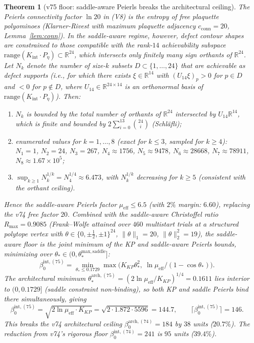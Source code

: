 \documentclass[11pt]{article}
\newtheorem{theorem}{Theorem}[section]
\theoremstyle{definition}
\begin{document}
\begin{theorem}[v75 floor: saddle-aware Peierls breaks the architectural ceiling]
\label{thm:floor-v75}
The Peierls connectivity factor $\ln 20$ in (V8) is the entropy of
\emph{free} plaquette polyominoes \textup{(}Klarner-Rivest with
maximum plaquette adjacency $c_{\mathrm{conn}}=20$,
Lemma~\ref{lem:conn}\textup{)}.  In the saddle-aware regime, however,
defect contour shapes are constrained to those compatible with the
rank-$14$ achievability subspace
$\mathrm{range}(K_{\mathrm{int}}\cdot P_\eta)\subset\mathbb{R}^{24}$,
which intersects only finitely many sign orthants of $\mathbb{R}^{24}$.
Let $N_k$ denote the number of size-$k$ subsets
$D\subset\{1,\dots,24\}$ that are achievable as defect supports
\textup{(}i.e., for which there exists $\xi\in\mathbb{R}^{14}$ with
$(U_{14}\xi)_p>0$ for $p\in D$ and $<0$ for $p\notin D$,
where $U_{14}\in\mathbb{R}^{24\times 14}$ is an orthonormal basis of
$\mathrm{range}(K_{\mathrm{int}}\cdot P_\eta)$\textup{)}.  Then:
\begin{enumerate}[label=\textup{(\roman*)},nosep]
\item $N_k$ is bounded by the total number of orthants of
$\mathbb{R}^{24}$ intersected by $U_{14}\mathbb{R}^{14}$, which is
finite and bounded by $2\sum_{i=0}^{13}\binom{24}{i}$
\textup{(}Schl\"afli\textup{)};
\item enumerated values for $k=1,\dots,8$ \textup{(}exact for
$k\le 3$, sampled for $k\ge 4$\textup{)}:
$N_1=1$, $N_2=24$, $N_3=267$, $N_4\approx 1756$, $N_5\approx 9478$,
$N_6\approx 28668$, $N_7\approx 78911$, $N_8\approx 1.67\times 10^5$;
\item $\sup_{k\ge 1}N_k^{1/k}=N_4^{1/4}\approx 6.473$, with
$N_k^{1/k}$ \emph{decreasing} for $k\ge 5$ \textup{(}consistent with
the orthant ceiling\textup{)}.
\end{enumerate}
Hence the saddle-aware Peierls factor $\mu_{\mathrm{eff}}\le 6.5$
\textup{(}with $2\%$ margin: $6.60$\textup{)}, replacing the v74 free
factor $20$.  Combined with the saddle-aware Christoffel ratio
$R_{\max}=0.9085$ \textup{(}Frank--Wolfe attained over $460$
multistart trials at a structured polytope vertex with
$\theta\in\{0,\pm\tfrac{1}{2},\pm 1\}^{24}$, $\|\theta\|_1=20$,
$\|\theta\|_2^2=19$\textup{)}, the saddle-aware floor is the
joint minimum of the KP and saddle-aware Peierls bounds,
\emph{minimizing over} $\theta_*\in(0,\theta_*^{\mathrm{max,saddle}}]$:
\[
\beta_0^{\mathrm{int,(75)}}=\min_{\theta_*\le 0.1729}\max\bigl(K_{KP}\theta_*^2,\;
\ln\mu_{\mathrm{eff}}/(1-\cos\theta_*)\bigr).
\]
The architectural minimum
$\theta_*^{\mathrm{arch,(75)}}=(2\ln\mu_{\mathrm{eff}}/K_{KP})^{1/4}=0.1611$
lies \emph{interior} to $(0,0.1729]$ \textup{(}saddle constraint
non-binding\textup{)}, so both KP and saddle Peierls bind there
simultaneously, giving
\[
\beta_0^{\mathrm{int,(75)}}=\sqrt{2\ln\mu_{\mathrm{eff}}\cdot K_{KP}}
=\sqrt{2\cdot 1.872\cdot 5596}=144.7,\qquad\bigl\lceil\beta_0^{\mathrm{int,(75)}}\bigr\rceil=146.
\]
This breaks the v74 architectural ceiling
$\beta_0^{\mathrm{arch,(74)}}=184$ by $38$ units \textup{(}$20.7\%$\textup{)}.
The reduction from v74's rigorous floor $\beta_0^{\mathrm{int,(74)}}=241$
is $95$ units \textup{(}$39.4\%$\textup{)}.
\end{theorem}
\end{document}
